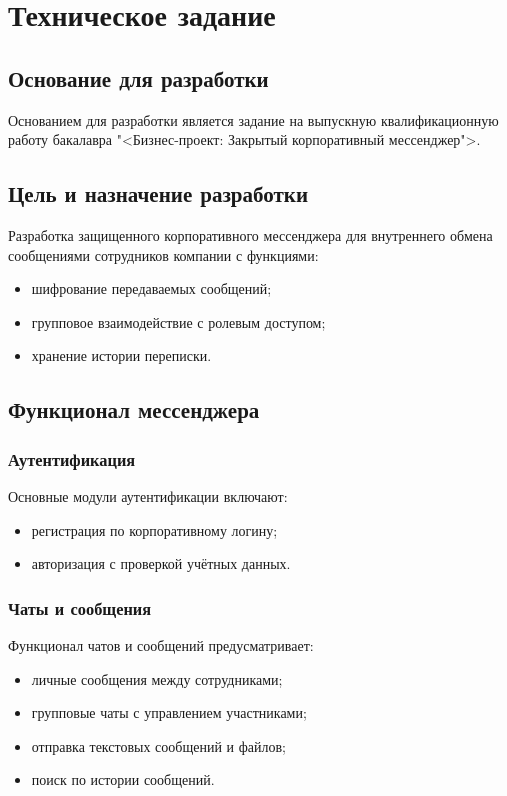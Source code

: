 \section{Техническое задание}
\subsection{Основание для разработки}

Основанием для разработки является задание на выпускную квалификационную работу бакалавра "<Бизнес-проект: Закрытый корпоративный мессенджер">.

\subsection{Цель и назначение разработки}

Разработка защищенного корпоративного мессенджера для внутреннего обмена сообщениями сотрудников компании с функциями:
\begin{itemize}
	\item шифрование передаваемых сообщений;
	\item групповое взаимодействие с ролевым доступом;
	\item хранение истории переписки.
\end{itemize}

	
\subsection{Функционал мессенджера}

\subsubsection{Аутентификация}  
Основные модули аутентификации включают:  
\begin{itemize}  
	\item регистрация по корпоративному логину;  
	\item авторизация с проверкой учётных данных.  
\end{itemize}  

\subsubsection{Чаты и сообщения}  
Функционал чатов и сообщений предусматривает:  
\begin{itemize}  
	\item личные сообщения между сотрудниками;  
	\item групповые чаты с управлением участниками;  
	\item отправка текстовых сообщений и файлов;  
	\item поиск по истории сообщений.  
\end{itemize}  


